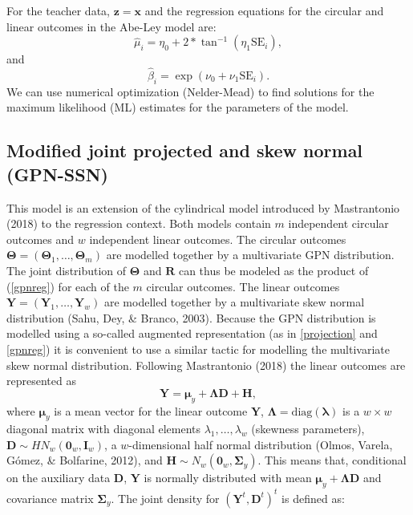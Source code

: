 \documentclass[12pt,]{article}
\begin{document}
\noindent For the teacher data, \(\boldsymbol{z} = \boldsymbol{x}\) and
the regression equations for the circular and linear outcomes in the
Abe-Ley model are: \[\hat{\mu}_{i} = \eta_0 + 2 *
\tan^{-1}(\eta_1\text{SE}_i),\] and \[\hat{\beta}_{i} = \exp(\nu_0 +
\nu_1\text{SE}_i).\] \noindent We can use numerical optimization
(Nelder-Mead) to find solutions for the maximum likelihood (ML)
estimates for the parameters of the model.

\subsection{Modified joint projected and skew normal (GPN-SSN)}\label{CL-GPN_multivariate}

This model is an extension of the cylindrical model introduced by
Mastrantonio (2018) to the regression context. Both models contain \(m\)
independent circular outcomes and \(w\) independent linear outcomes. The
circular outcomes
\(\boldsymbol{\Theta} = (\boldsymbol{\Theta}_1, \dots,  \boldsymbol{\Theta}_m)\)
are modelled together by a multivariate GPN distribution. The joint
distribution of \(\boldsymbol{\Theta}\) and \(\boldsymbol{R}\) can thus
be modeled as the product of (\ref{gpnreg}) for each of the \(m\)
circular outcomes. The linear outcomes
\(\boldsymbol{Y} = (\boldsymbol{Y}_1,  \dots, \boldsymbol{Y}_w)\) are
modelled together by a multivariate skew normal distribution (Sahu, Dey,
\& Branco, 2003). Because the GPN distribution is modelled using a
so-called augmented representation (as in \eqref{projection} and
\eqref{gpnreg}) it is convenient to use a similar tactic for modelling
the multivariate skew normal distribution. Following Mastrantonio (2018)
the linear outcomes are represented as
\[\boldsymbol{Y} = \boldsymbol{\mu}_y + \boldsymbol{\Lambda}\boldsymbol{D} + \boldsymbol{H},\]
\noindent where \(\boldsymbol{\mu}_y\) is a mean vector for the linear
outcome \(\boldsymbol{Y}\),
\(\boldsymbol{\Lambda} = \text{diag}(\boldsymbol{\lambda})\) is a
\(w \times w\) diagonal matrix with diagonal elements
\(\lambda_1, \dots, \lambda_w\) (skewness parameters),
\(\boldsymbol{D} \sim HN_w(\boldsymbol{0}_w, \boldsymbol{I}_w)\), a
\(w\)-dimensional half normal distribution (Olmos, Varela, Gómez, \&
Bolfarine, 2012), and
\(\boldsymbol{H} \sim N_w(\boldsymbol{0}_w, \boldsymbol{\Sigma}_y)\).
This means that, conditional on the auxiliary data \(\boldsymbol{D}\),
\(\boldsymbol{Y}\) is normally distributed with mean
\(\boldsymbol{\mu}_y + \boldsymbol{\Lambda}\boldsymbol{D}\) and
covariance matrix \(\boldsymbol{\Sigma}_y\). The joint density for
\((\boldsymbol{Y}^t, \boldsymbol{D}^t)^t\) is defined as:
\end{document}
